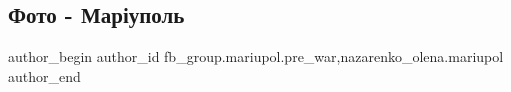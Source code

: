  
 
 
 
 

\subsection{Фото - Маріуполь}
\label{sec:27_02_2023.fb.fb_group.mariupol.pre_war.6.foto___mar_upol}
 
\ifcmt
 author_begin
   author_id fb_group.mariupol.pre_war,nazarenko_olena.mariupol
 author_end
\fi
